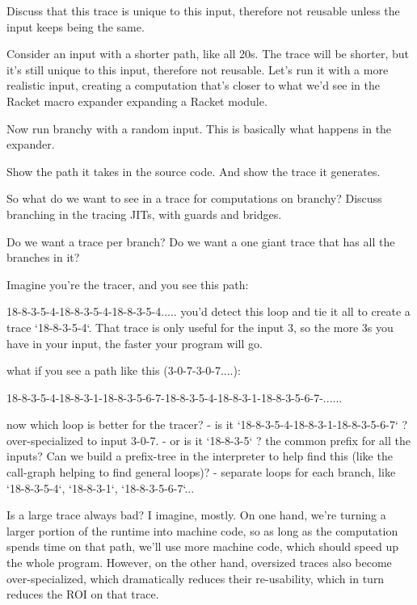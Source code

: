 			\begin{paragraph-here}
				Discuss that this trace is unique to this input, therefore not reusable unless the input keeps being the same.
			\end{paragraph-here}

			\begin{paragraph-here}
				Consider an input with a shorter path, like all 20s. The trace will be shorter, but it's still unique to this input, therefore not reusable.
				Let's run it with a more realistic input, creating a computation that's closer to what we'd see in the Racket macro expander expanding a Racket module.
			\end{paragraph-here}

			\begin{show-experiment}
				Now run branchy with a random input. This is basically what happens in the expander.

				Show the path it takes in the source code. And show the trace it generates.
			\end{show-experiment}

			\begin{paragraph-here}
				So what do we want to see in a trace for computations on branchy? Discuss branching in the tracing JITs, with guards and bridges.

				Do we want a trace per branch? Do we want a one giant trace that has all the branches in it?

				Imagine you're the tracer, and you see this path:

				18-8-3-5-4-18-8-3-5-4-18-8-3-5-4..... you'd detect this loop and tie it all to create a trace `18-8-3-5-4`. That trace is only useful for the input 3, so the more 3s you have in your input, the faster your program will go.

				what if you see a path like this (3-0-7-3-0-7....):

				18-8-3-5-4-18-8-3-1-18-8-3-5-6-7-18-8-3-5-4-18-8-3-1-18-8-3-5-6-7-......

				now which loop is better for the tracer?
				- is it `18-8-3-5-4-18-8-3-1-18-8-3-5-6-7` ? over-specialized to input 3-0-7.
				- or is it `18-8-3-5` ? the common prefix for all the inputs? Can we build a prefix-tree in the interpreter to help find this (like the call-graph helping to find general loops)?
				- separate loops for each branch, like `18-8-3-5-4`, `18-8-3-1`, `18-8-3-5-6-7`...

				Is a large trace always bad? I imagine, mostly. On one hand, we're turning a larger portion of the runtime into machine code, so as long as the computation spends time on that path, we'll use more machine code, which should speed up the whole program. However, on the other hand, oversized traces also become over-specialized, which dramatically reduces their re-usability, which in turn reduces the ROI on that trace.

			\end{paragraph-here}

